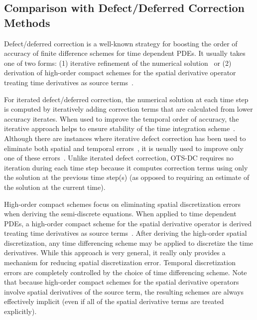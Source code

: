 \documentclass[fleqn,12pt,twoside]{article}
\begin{document}
\subsection{Comparison with Defect/Deferred Correction Methods}
Defect/deferred correction is a well-known strategy for boosting the order of 
accuracy of finite difference schemes for time dependent PDEs.  It usually 
takes one of two forms: 
(1) iterative refinement of the numerical
solution~\cite{pereyra_1968,stetter_1978,gustafsson_2002,kress_2002,kress_2006}
or 
(2) derivation of high-order compact schemes for the spatial derivative 
operator treating time derivatives as source 
terms~\cite{spotz_2001,ito_2005,heidenreich_2007}. 

For iterated defect/deferred correction, the numerical solution at each 
time step is computed by iteratively adding correction terms that are 
calculated from lower accuracy iterates.  When used to improve the 
temporal order of accuracy, the iterative approach helps to ensure 
stability of the time integration scheme~\cite{kress_2006}.  Although there 
are instances where iterative defect correction has been used to eliminate 
both spatial and temporal errors~\cite{gustafsson_2002}, it is usually used to 
improve only one of these errors~\cite{pereyra_1968,kress_2002,kress_2006}.
Unlike iterated defect correction, OTS-DC requires no iteration during each
time step because it computes correction terms using only the solution at the
previous time step(s) (as opposed to requiring an estimate of the solution at
the current time).

High-order compact schemes focus on eliminating spatial discretization errors 
when deriving the semi-discrete equations.  When applied to time dependent 
PDEs, a high-order compact scheme for the spatial derivative operator is 
derived treating time derivatives as source 
terms~\cite{spotz_2001,ito_2005,heidenreich_2007}.  
After deriving the high-order spatial discretization, any time differencing 
scheme may be applied to discretize the time derivatives.  While this 
approach is very general, it really only provides a mechanism for reducing 
spatial discretization error.  Temporal discretization errors are completely 
controlled by the choice of time differencing scheme.  Note that because 
high-order compact schemes for the spatial derivative operators involve spatial 
derivatives of the source term, the resulting schemes are always effectively 
implicit (even if all of the spatial derivative terms are treated explicitly).  
\end{document}
